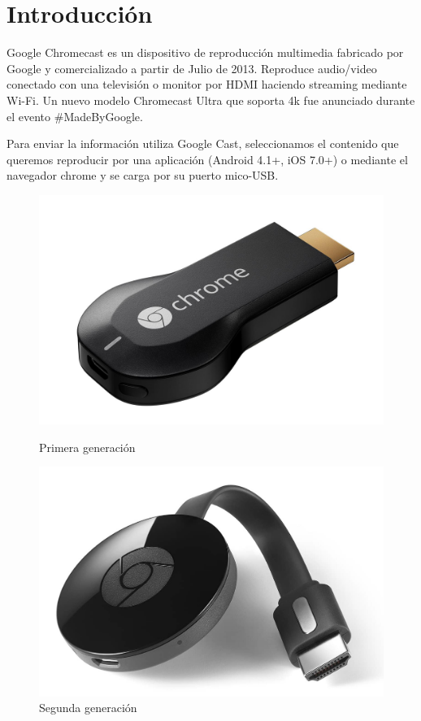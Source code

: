 \section{Introducción}
Google Chromecast es un dispositivo de reproducción multimedia fabricado por Google y comercializado a partir de Julio de 2013. Reproduce audio/video conectado con una televisión o monitor por HDMI haciendo streaming mediante Wi-Fi. Un nuevo modelo Chromecast Ultra que soporta 4k fue anunciado durante el evento $\#$MadeByGoogle.

Para enviar la información utiliza Google Cast, seleccionamos el contenido que queremos reproducir por una aplicación (Android 4.1+, iOS 7.0+) o mediante el navegador chrome y se carga por su puerto mico-USB.

\begin{figure}[h]
	\centering
	\begin{minipage}[b]{.35\textwidth}
		\includegraphics[scale=0.11]{./Imagenes/chromecast1gen.jpg}
		\caption{Primera generación}\label{fig:1gen}
	\end{minipage}\qquad
	\hspace{1cm}
	\begin{minipage}[b]{.35\textwidth}
		\includegraphics[scale=0.15]{./Imagenes/Chromecast.jpg}
		\caption{Segunda generación}\label{fig:2gen}
	\end{minipage}
\end{figure}

